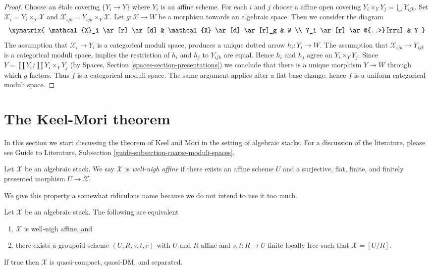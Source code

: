 \begin{proof}
Choose an \'etale covering $\{Y_i \to Y\}$ where $Y_i$ is an affine scheme.
For each $i$ and $j$ choose a affine open covering
$Y_i \times_Y Y_j = \bigcup Y_{ijk}$.
Set $\mathcal{X}_i = Y_i \times_Y \mathcal{X}$ and
$\mathcal{X}_{ijk} = Y_{ijk} \times_Y \mathcal{X}$.
Let $g : \mathcal{X} \to W$ be a morphism towards
an algebraic space. Then we consider the diagram
$$
\xymatrix{
\mathcal{X}_i \ar[r] \ar[d] & \mathcal{X} \ar[d] \ar[r]_g & W \\
Y_i \ar[r] \ar@{..>}[rru] & Y
}
$$
The assumption that $\mathcal{X}_i \to Y_i$ is a categorical moduli
space, produces a unique dotted arrow $h_i : Y_i \to W$.
The assumption that $\mathcal{X}_{ijk} \to Y_{ijk}$ is a categorical
moduli space, implies the restriction of $h_i$ and $h_j$ to
$Y_{ijk}$ are equal. Hence $h_i$ and $h_j$ agree on $Y_i \times_Y Y_j$.
Since $Y = \coprod Y_i / \coprod Y_i \times_Y Y_j$
(by Spaces, Section \ref{spaces-section-presentations}) we conclude
that there is a unique morphism $Y \to W$ through which $g$ factors.
Thus $f$ is a categorical moduli space. The same argument applies
after a flat base change, hence $f$ is a uniform categorical moduli space.
\end{proof}







\section{The Keel-Mori theorem}
\label{section-Keel-Mori}

\noindent
In this section we start discussing the theorem of Keel and Mori
in the setting of algebraic stacks. For a discussion of the
literature, please see Guide to Literature, Subsection
\ref{guide-subsection-coarse-moduli-spaces}.

\begin{definition}
\label{definition-well-nigh-affine}
Let $\mathcal{X}$ be an algebraic stack. We say $\mathcal{X}$
is {\it well-nigh affine} if there exists an affine scheme $U$
and a surjective, flat, finite, and finitely presented morphism
$U \to \mathcal{X}$.
\end{definition}

\noindent
We give this property a somewhat ridiculous name because we do not intend to
use it too much.

\begin{lemma}
\label{lemma-well-nigh-affine}
Let $\mathcal{X}$ be an algebraic stack. The following are equivalent
\begin{enumerate}
\item $\mathcal{X}$ is well-nigh affine, and
\item there exists a groupoid scheme $(U, R, s, t, c)$ with $U$ and
$R$ affine and $s, t : R \to U$ finite locally free such that
$\mathcal{X} = [U/R]$.
\end{enumerate}
If true then $\mathcal{X}$ is quasi-compact, quasi-DM, and separated.
\end{lemma}


